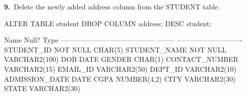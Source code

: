 
\noindent\begin{minipage}{\linewidth}
\begingroup{}
{\fontsize{14}{17}\selectfont\textbf{9.}}\ Delete the newly added address column from the STUDENT table.\par
\endgroup\vspace{12pt}


\begin{sqlcode}
ALTER TABLE student DROP COLUMN address;
DESC student;
\end{sqlcode}

\vspace{18pt}


\begin{sqlout}
 Name                                      Null?    Type
 ----------------------------------------- -------- ----------------------------
 STUDENT_ID                                NOT NULL CHAR(5)
 STUDENT_NAME                              NOT NULL VARCHAR2(100)
 DOB                                                DATE
 GENDER                                             CHAR(1)
 CONTACT_NUMBER                                     VARCHAR2(15)
 EMAIL_ID                                           VARCHAR2(50)
 DEPT_ID                                            VARCHAR2(10)
 ADMISSION_DATE                                     DATE
 CGPA                                               NUMBER(4,2)
 CITY                                               VARCHAR2(30)
 STATE                                              VARCHAR2(30)
\end{sqlout}
\end{minipage}\par\vspace{30pt}

